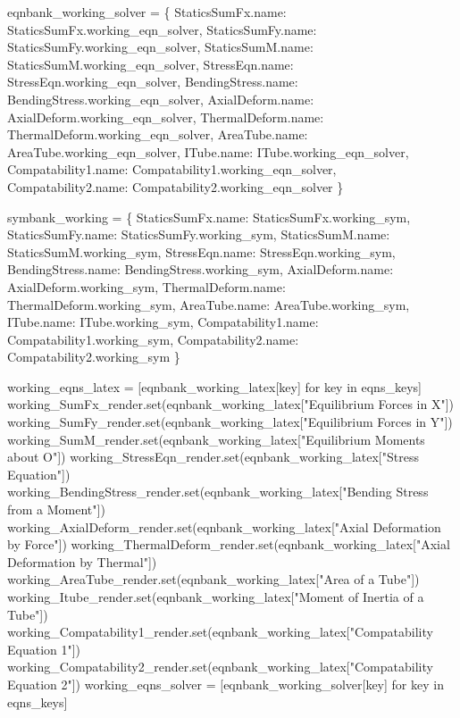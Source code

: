 \documentclass[
  letterpaper,
  DIV=11,
  numbers=noendperiod]{scrreprt}
\newenvironment{Shaded}{\begin{snugshade}}{\end{snugshade}}
\newcommand{\NormalTok}[1]{\textcolor[rgb]{0.00,0.23,0.31}{#1}}
\begin{document}
\begin{Shaded}
\begin{Highlighting}[]
\NormalTok{        eqnbank\_working\_solver = \{}
\NormalTok{        StaticsSumFx.name: StaticsSumFx.working\_eqn\_solver,}
\NormalTok{        StaticsSumFy.name: StaticsSumFy.working\_eqn\_solver,}
\NormalTok{        StaticsSumM.name: StaticsSumM.working\_eqn\_solver,}
\NormalTok{        StressEqn.name: StressEqn.working\_eqn\_solver,}
\NormalTok{        BendingStress.name: BendingStress.working\_eqn\_solver,}
\NormalTok{        AxialDeform.name: AxialDeform.working\_eqn\_solver,}
\NormalTok{        ThermalDeform.name: ThermalDeform.working\_eqn\_solver,}
\NormalTok{        AreaTube.name: AreaTube.working\_eqn\_solver,}
\NormalTok{        ITube.name: ITube.working\_eqn\_solver,}
\NormalTok{        Compatability1.name: Compatability1.working\_eqn\_solver,}
\NormalTok{        Compatability2.name: Compatability2.working\_eqn\_solver}
\NormalTok{        \}}

\NormalTok{        symbank\_working = \{}
\NormalTok{        StaticsSumFx.name: StaticsSumFx.working\_sym,}
\NormalTok{        StaticsSumFy.name: StaticsSumFy.working\_sym,}
\NormalTok{        StaticsSumM.name: StaticsSumM.working\_sym,}
\NormalTok{        StressEqn.name: StressEqn.working\_sym,}
\NormalTok{        BendingStress.name: BendingStress.working\_sym,}
\NormalTok{        AxialDeform.name: AxialDeform.working\_sym,}
\NormalTok{        ThermalDeform.name: ThermalDeform.working\_sym,}
\NormalTok{        AreaTube.name: AreaTube.working\_sym,}
\NormalTok{        ITube.name: ITube.working\_sym,}
\NormalTok{        Compatability1.name: Compatability1.working\_sym,}
\NormalTok{        Compatability2.name: Compatability2.working\_sym}
\NormalTok{        \}}
        
\NormalTok{        working\_eqns\_latex = [eqnbank\_working\_latex[key] for key in eqns\_keys]}
\NormalTok{        working\_SumFx\_render.set(eqnbank\_working\_latex["Equilibrium Forces in X"])}
\NormalTok{        working\_SumFy\_render.set(eqnbank\_working\_latex["Equilibrium Forces in Y"])}
\NormalTok{        working\_SumM\_render.set(eqnbank\_working\_latex["Equilibrium Moments about O"])}
\NormalTok{        working\_StressEqn\_render.set(eqnbank\_working\_latex["Stress Equation"])}
\NormalTok{        working\_BendingStress\_render.set(eqnbank\_working\_latex["Bending Stress from a Moment"])}
\NormalTok{        working\_AxialDeform\_render.set(eqnbank\_working\_latex["Axial Deformation by Force"])}
\NormalTok{        working\_ThermalDeform\_render.set(eqnbank\_working\_latex["Axial Deformation by Thermal"])}
\NormalTok{        working\_AreaTube\_render.set(eqnbank\_working\_latex["Area of a Tube"])}
\NormalTok{        working\_Itube\_render.set(eqnbank\_working\_latex["Moment of Inertia of a Tube"])}
\NormalTok{        working\_Compatability1\_render.set(eqnbank\_working\_latex["Compatability Equation 1"])}
\NormalTok{        working\_Compatability2\_render.set(eqnbank\_working\_latex["Compatability Equation 2"])}
\NormalTok{        working\_eqns\_solver = [eqnbank\_working\_solver[key] for key in eqns\_keys]}
        

\end{Highlighting}
\end{Shaded}
\end{document}
